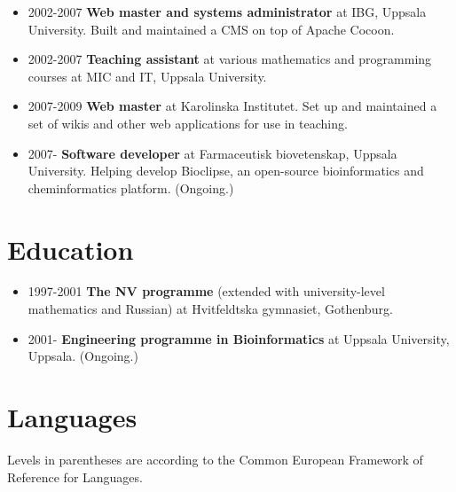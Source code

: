 \documentclass[11pt,a4paper]{article}
\begin{document}
\begin{itemize}

\item 2002-2007 \textbf{Web master and systems administrator} at IBG, Uppsala
University. Built and maintained a CMS on top of Apache Cocoon.

\item 2002-2007 \textbf{Teaching assistant} at various mathematics and
programming courses at MIC and IT, Uppsala University.

\item 2007-2009 \textbf{Web master} at Karolinska Institutet. Set up and
maintained a set of wikis and other web applications for use in teaching.

\item 2007-\hspace{2em} \textbf{Software developer} at Farmaceutisk
biovetenskap, Uppsala University. Helping develop Bioclipse, an open-source
bioinformatics and cheminformatics platform. (Ongoing.)

\end{itemize}

\section*{Education}

\begin{itemize}

\item 1997-2001 \textbf{The NV programme} (extended with university-level
mathematics and Russian) at Hvitfeldtska gymnasiet, Gothenburg.

\item 2001-\hspace{2em} \textbf{Engineering programme in Bioinformatics} at
Uppsala University, Uppsala. (Ongoing.)

\end{itemize}

\section*{Languages}

Levels in parentheses are according to the Common European Framework
of Reference for Languages.
\end{document}
